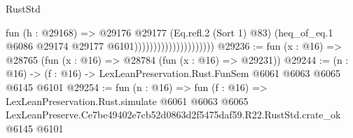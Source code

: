 \begin{lexlean}{RustStd}
\begin{coremodule}
                                          fun (h : @29168) =>
                                          @29176
                                            @29177
                                            (Eq.refl.{2} (Sort 1) @83)
                                            (heq_of_eq.{1}
                                              @6086
                                              @29174
                                              @29177
                                              @6101)))))))))))))))))))))
@29236 := fun (x : @16) => @28765 (fun (x : @16) => @28784 (fun (x : @16) => @29231))
@29244 := (n : @16) -> (f : @16) -> LexLeanPreservation.Rust.FunSem @6061 @6063 @6065 @6145 @6101
@29254 := fun (n : @16) =>
  fun (f : @16) =>
  LexLeanPreservation.Rust.simulate
    @6061
    @6063
    @6065
    LexLeanPreserve.Ce7be49402e7cb52d0863d2f5475daf59.R22.RustStd.crate_ok
    @6145
    @6101
\end{coremodule}
\end{lexlean}
